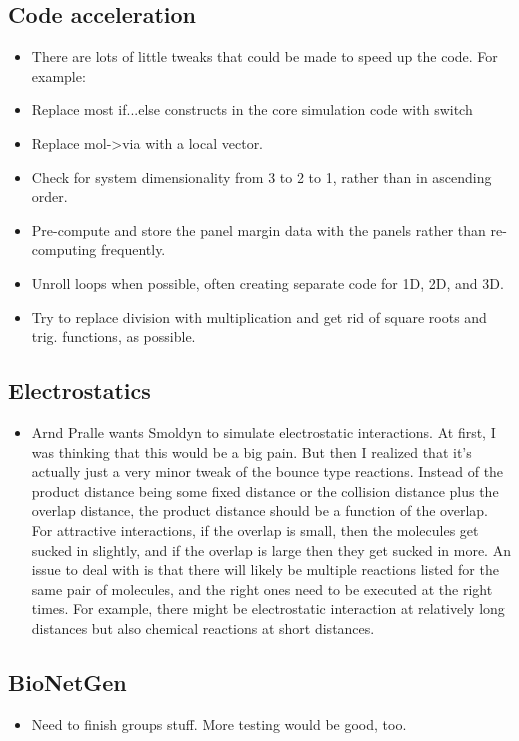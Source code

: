 \documentclass {scrbook}
\begin{document}
\subsection*{Code acceleration}
\begin{itemize}
\item There are lots of little tweaks that could be made to speed up the code. For example:
\item Replace most if...else constructs in the core simulation code with switch
\item Replace mol->via with a local vector.
\item Check for system dimensionality from 3 to 2 to 1, rather than in ascending order.
\item Pre-compute and store the panel margin data with the panels rather than re-computing frequently.
\item Unroll loops when possible, often creating separate code for 1D, 2D, and 3D.
\item Try to replace division with multiplication and get rid of square roots and trig. functions, as possible.
\end{itemize}

\subsection*{Electrostatics}
\begin{itemize}
\item Arnd Pralle wants Smoldyn to simulate electrostatic interactions. At first, I was thinking that this would be a big pain. But then I realized that it's actually just a very minor tweak of the bounce type reactions. Instead of the product distance being some fixed distance or the collision distance plus the overlap distance, the product distance should be a function of the overlap. For attractive interactions, if the overlap is small, then the molecules get sucked in slightly, and if the overlap is large then they get sucked in more. An issue to deal with is that there will likely be multiple reactions listed for the same pair of molecules, and the right ones need to be executed at the right times. For example, there might be electrostatic interaction at relatively long distances but also chemical reactions at short distances.
\end{itemize}

\subsection*{BioNetGen}
\begin{itemize}
\item Need to finish groups stuff. More testing would be good, too.
\end{itemize}
\end{document}

